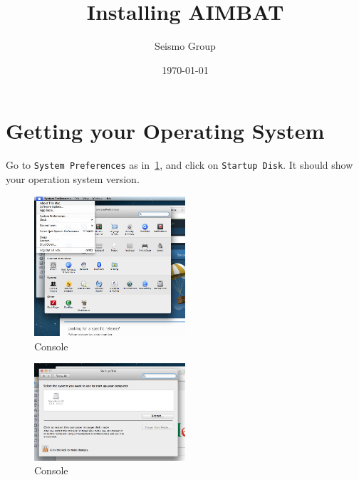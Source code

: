 \documentclass[letterpaper,10pt]{article}
\title{Installing AIMBAT}
\author{Seismo Group}
\date{\today}
\begin{document}
\maketitle


\section{Getting your Operating System}

Go to \verb"System Preferences" as in~\ref{fig:system_preferences}, and click on \verb"Startup Disk". It should show your operation system version.

\begin{figure}[h!]
  \centering
  \includegraphics[width=0.5\textwidth]{images/system_preferences}
  \caption{Console}
  \label{fig:system_preferences}
\end{figure}

\begin{figure}[h!]
  \centering
  \includegraphics[width=0.5\textwidth]{images/startup_disk}
  \caption{Console}
  \label{fig:startup_disk}
\end{figure}
\end{document}
